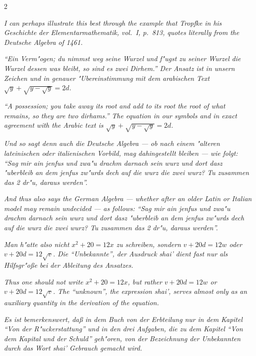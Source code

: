 \documentclass[10pt,a4paper]{article}
\newcommand{\enquote}[1]{``#1''}
\begin{document}
\begin{paracol}{2}
\switchcolumn

\textit{I can perhaps illustrate this best through the example that Tropfke in his \textit{Geschichte der Elementarmathematik}, vol.\ I, p.\ 813, quotes literally from the \textit{Deutsche Algebra} of 1461.}

\switchcolumn*

\textit{\enquote{Ein Verm"ogen; du nimmst weg seine Wurzel und f"ugst zu seiner Wurzel die Wurzel dessen was bleibt, so sind es zwei Dirhem.} Der Ansatz ist in unsern Zeichen und in genauer "Ubereinstimmung mit dem arabischen Text $\sqrt{y} + \sqrt{y - \sqrt{y}} = 2d$.}

\switchcolumn

\textit{\enquote{A possession; you take away its root and add to its root the root of what remains, so they are two dirhams.} The equation in our symbols and in exact agreement with the Arabic text is $\sqrt{y} + \sqrt{y - \sqrt{y}} = 2d$.}

\switchcolumn*

\textit{Und so sagt denn auch die Deutsche Algebra --- ob nach einem "alteren lateinischen oder italienischen Vorbild, mag dahingestellt bleiben --- wie folgt: \enquote{Sag mir ain jenfus und zwa"u drachm darnach sein wurz und dort dasz "uberbleib an dem jenfus zw"urds dech auf die wurz die zwei wurz? Tu zusammen das 2 dr"u, daraus werden}.}

\switchcolumn

\textit{And thus also says the German Algebra --- whether after an older Latin or Italian model may remain undecided --- as follows: \enquote{Sag mir ain jenfus und zwa"u drachm darnach sein wurz und dort dasz "uberbleib an dem jenfus zw"urds dech auf die wurz die zwei wurz? Tu zusammen das 2 dr"u, daraus werden}.}

\switchcolumn*

\textit{Man h"atte also nicht $x^{2} + 20 = 12x$ zu schreiben, sondern $v + 20d = 12w$ oder $v + 20d = 12\sqrt{v}$. Die \enquote{Unbekannte}, der Ausdruck \textit{shai'} dient fast nur als Hilfsgr"o\ss{}e bei der Ableitung des Ansatzes.}

\switchcolumn

\textit{Thus one should not write $x^{2} + 20 = 12x$, but rather $v + 20d = 12w$ or $v + 20d = 12\sqrt{v}$. The \enquote{unknown}, the expression \textit{shai'}, serves almost only as an auxiliary quantity in the derivation of the equation.}

\switchcolumn*

\textit{Es ist bemerkenswert, da\ss{} in dem Buch von der Erbteilung nur in dem Kapitel \enquote{Von der R"uckerstattung} und in den drei Aufgaben, die zu dem Kapitel \enquote{Von dem Kapital und der Schuld} geh"oren, von der Bezeichnung der Unbekannten durch das Wort \textit{shai'} Gebrauch gemacht wird.}


\end{paracol}
\end{document}
